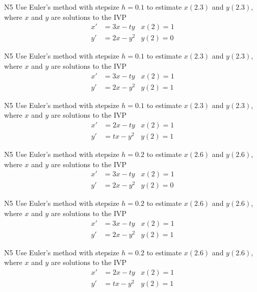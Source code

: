 \begin{problem}{N5}
Use Euler's method with stepsize \(h=0.1\) to estimate \(x(2.3)\) and \(y(2.3)\), where \(x\) and \(y\) are solutions to the IVP
\begin{align*}
x'&=3x-ty & x(2)=1 \\
y'&=2x-y^2 & y(2)=0 
\end{align*}
\end{problem}

\begin{problem}{N5}
Use Euler's method with stepsize \(h=0.1\) to estimate \(x(2.3)\) and \(y(2.3)\), where \(x\) and \(y\) are solutions to the IVP
\begin{align*}
x'&=3x-ty & x(2)=1 \\
y'&=2x-y^2 & y(2)=1 
\end{align*}
\end{problem}

\begin{problem}{N5}
Use Euler's method with stepsize \(h=0.1\) to estimate \(x(2.3)\) and \(y(2.3)\), where \(x\) and \(y\) are solutions to the IVP
\begin{align*}
x'&=2x-ty & x(2)=1 \\
y'&=tx-y^2 & y(2)=1 
\end{align*}
\end{problem}

\begin{problem}{N5}
Use Euler's method with stepsize \(h=0.2\) to estimate \(x(2.6)\) and \(y(2.6)\), where \(x\) and \(y\) are solutions to the IVP
\begin{align*}
x'&=3x-ty & x(2)=1 \\
y'&=2x-y^2 & y(2)=0 
\end{align*}
\end{problem}

\begin{problem}{N5}
Use Euler's method with stepsize \(h=0.2\) to estimate \(x(2.6)\) and \(y(2.6)\), where \(x\) and \(y\) are solutions to the IVP
\begin{align*}
x'&=3x-ty & x(2)=1 \\
y'&=2x-y^2 & y(2)=1 
\end{align*}
\end{problem}

\begin{problem}{N5}
Use Euler's method with stepsize \(h=0.2\) to estimate \(x(2.6)\) and \(y(2.6)\), where \(x\) and \(y\) are solutions to the IVP
\begin{align*}
x'&=2x-ty & x(2)=1 \\
y'&=tx-y^2 & y(2)=1 
\end{align*}
\end{problem}

